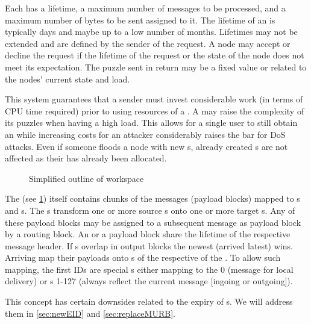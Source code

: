 Each  has a lifetime, a maximum number of messages to be processed, and a maximum number of bytes to be sent assigned to it. The lifetime of an  is typically days and maybe up to a low number of months. Lifetimes may not be extended and are defined by the sender of the request. A node may accept or decline the request if the lifetime of the request or the state of the node does not meet its expectation. The puzzle sent in return may be a fixed value or related to the nodes' current state and load.

This system guarantees that a sender must invest considerable work (in terms of CPU time required) prior to using resources of a \VortexNode. A \VortexNode{} may raise the complexity of its puzzles when having a  high load. This allows for a single user to still obtain an  while increasing costs for an attacker considerably raises the bar for DoS attacks. Even if someone floods a node with new s, already created s are not affected as their  has already been allocated.

\begin{figure}[ht]
	\centering\resizebox{.95\linewidth}{!}{
		
	}
	\caption{Simplified outline of  workspace}
	\label{fig:workspace}
\end{figure}


The  (see \cref{fig:workspace}) itself contains chunks of the messages (payload blocks) mapped to s and s. The s transform one or more source s onto one or more target s. Any of these payload blocks may be assigned to a subsequent message as payload block by a routing block. An  or a payload block share the lifetime of the respective message header. If s overlap in output blocks the newest  (arrived latest) wins. Arriving \VortexMessages{} map their payloads onto s of the respective  of the . To allow such mapping, the first IDs are special s either mapping to the  0 (message for local delivery) or s 1-127 (always reflect the current message [ingoing or outgoing]).

This concept has certain downsides related to the expiry of s. We will address them in \cref{sec:newEID} and \ref{sec:replaceMURB}.

